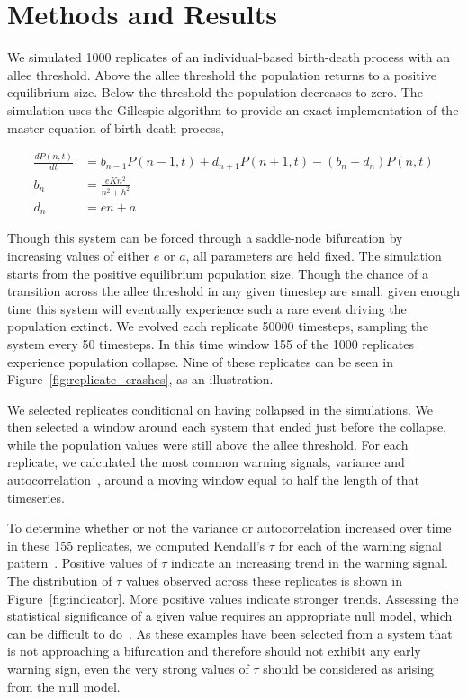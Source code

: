 \documentclass[authoryear,preprint,11pt]{elsarticle}
\begin{document}
 \section{Methods and Results}
 We simulated 1000 replicates of an individual-based birth-death process with an allee threshold.  Above the allee threshold the population returns to a positive equilibrium size.  Below the threshold the population decreases to zero. The simulation uses the Gillespie algorithm to provide an exact implementation of the master equation of birth-death process,

\begin{align}
  \frac{dP(n,t)}{dt} &= b_{n-1} P(n-1,t) + d_{n+1}P(n+1,t) - (b_n+d_n) P(n,t)  \label{master} \\
    b_n &= \frac{e K n^2}{n^2 + h^2} \\
    d_n &= e n + a
\end{align}

Though this system can be forced through a saddle-node bifurcation by
increasing values of either $e$ or $a$, all parameters are held fixed.
The simulation starts from the positive equilibrium population size.
Though the chance of a transition across the allee threshold in any 
given timestep are small, given enough time this system will eventually
experience such a rare event driving the population extinct.  We evolved
each replicate 50000 timesteps, sampling the system every 50 timesteps.  
In this time window 155 of the 1000 replicates experience population collapse.  
Nine of these replicates can be seen in Figure~\ref{fig:replicate_crashes},
as an illustration. 

We selected replicates conditional on having collapsed in the simulations.
We then selected a window around each system that ended just before the
collapse, while the population values were still above the allee threshold.
For each replicate, we calculated the most common warning signals, variance
and autocorrelation~\citep[\emph{e.g.}][]{Carpenter2006,Dakos2008,Scheffer2009}, 
around a moving window equal to half the length of that
timeseries.  

To determine whether or not the variance or autocorrelation increased 
over time in these 155 replicates, we computed Kendall's $\tau$ for each of the
warning signal pattern~\citep{Dakos2008, Dakos2010}.  Positive values of $\tau$ 
indicate an increasing trend in the warning signal.  The distribution of $\tau$ 
values observed across these replicates is shown in Figure~\ref{fig:indicator}.
More positive values indicate stronger trends. Assessing the statistical significance
of a given value requires an appropriate null model, which can be difficult 
to do~\citep{Dakos2008}. As these examples have been selected from a system
that is not approaching a bifurcation and therefore should not exhibit any 
early warning sign, even the very strong values of $\tau$ should be considered 
as arising from the null model. 
\end{document}
